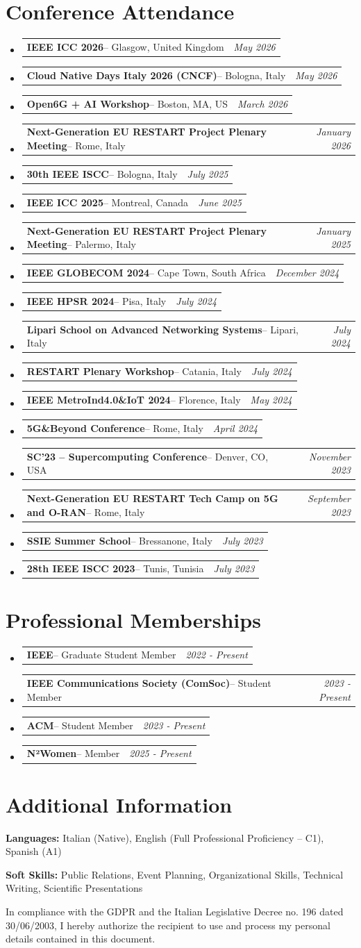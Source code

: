 \documentclass[a4paper,11pt]{article}
\makeatletter
\newcommand{\resumePOR}[3]{
\vspace{0.5mm}\item[]
    \begin{tabular*}{0.97\textwidth}[t]{l@{\extracolsep{\fill}}r}
        \textbf{#1}\hspace{0.3mm}#2 & \textit{\small{#3}}
    \end{tabular*}
    \vspace{-2mm}
}
\newcommand{\resumeSubHeadingListStart}{\begin{itemize}[leftmargin=*,labelsep=1mm]}
\newcommand{\resumeSubHeadingListEnd}{\end{itemize}\vspace{2mm}}
\makeatother
\begin{document}
\section{\textbf{Conference Attendance}}
\vspace{-0.4mm}
\resumeSubHeadingListStart
\resumePOR{IEEE ICC 2026}{-- Glasgow, United Kingdom}{May 2026}
\resumePOR{Cloud Native Days Italy 2026 (CNCF)}{-- Bologna, Italy}{May 2026}
\resumePOR{Open6G + AI Workshop}{-- Boston, MA, US}{March 2026}
\resumePOR{Next-Generation EU RESTART Project Plenary Meeting}{-- Rome, Italy}{January 2026}
\resumePOR{30th IEEE ISCC}{-- Bologna, Italy}{July 2025}
\resumePOR{IEEE ICC 2025}{-- Montreal, Canada}{June 2025}
\resumePOR{Next-Generation EU RESTART Project Plenary Meeting}{-- Palermo, Italy}{January 2025}
\resumePOR{IEEE GLOBECOM 2024}{-- Cape Town, South Africa}{December 2024}
\resumePOR{IEEE HPSR 2024}{-- Pisa, Italy}{July 2024}
\resumePOR{Lipari School on Advanced Networking Systems}{-- Lipari, Italy}{July 2024}
\resumePOR{RESTART Plenary Workshop}{-- Catania, Italy}{July 2024}
\resumePOR{IEEE MetroInd4.0\&IoT 2024}{-- Florence, Italy}{May 2024}
\resumePOR{5G\&Beyond Conference}{-- Rome, Italy}{April 2024}
\resumePOR{SC'23 -- Supercomputing Conference}{-- Denver, CO, USA}{November 2023}
\resumePOR{Next-Generation EU RESTART Tech Camp on 5G and O-RAN}{-- Rome, Italy}{September 2023}
\resumePOR{SSIE Summer School}{-- Bressanone, Italy}{July 2023}
\resumePOR{28th IEEE ISCC 2023}{-- Tunis, Tunisia}{July 2023}
\resumeSubHeadingListEnd

\section{\textbf{Professional Memberships}}
\vspace{-0.4mm}
\resumeSubHeadingListStart
\resumePOR{IEEE}
    {-- Graduate Student Member}
    {2022 - Present}
\resumePOR{IEEE Communications Society (ComSoc)}
    {-- Student Member}
    {2023 - Present}
\resumePOR{ACM}
    {-- Student Member}
    {2023 - Present}
\resumePOR{N²Women}
    {-- Member}
    {2025 - Present}
\resumeSubHeadingListEnd

\section{\textbf{Additional Information}}
\vspace{-0.4mm}
\small{
\textbf{Languages:} Italian (Native), English (Full Professional Proficiency -- C1), Spanish (A1)

\textbf{Soft Skills:} Public Relations, Event Planning, Organizational Skills, Technical Writing, Scientific Presentations

\vspace{1 cm}
In compliance with the GDPR and the Italian Legislative Decree no. 196 dated 30/06/2003, I hereby authorize the recipient to use and process my personal details contained in this document.
}
\end{document}
